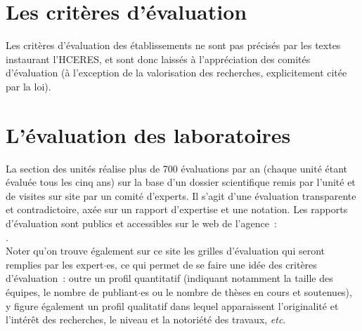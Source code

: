  


%
%
%



\section{Les crit\`eres d'\'evaluation}

Les crit\`eres d'\'evaluation des \'etablissements ne sont pas pr\'ecis\'es par les textes
instaurant l'HCERES, et sont donc laiss\'es \`a l'appr\'eciation des comit\'es d'\'evaluation
 (\`a l'exception de la valorisation des recherches, explicitement cit\'ee par la loi).



\section{L'\'evaluation des laboratoires}

La section des unit\'es r\'ealise plus de 700 \'evaluations par an
(chaque unit\'e \'etant \'evalu\'ee tous les cinq ans) sur la base d'un dossier scientifique
remis par l'unit\'e et de visites sur site par un comit\'e d'experts.
Il s'agit d'une \'evaluation transparente et contradictoire,
ax\'ee sur un rapport d'expertise et une notation.
Les rapports d'\'evaluation sont publics et accessibles sur le
web de l'agence~:\\
 .\\

Noter qu'on
trouve \'egalement sur ce site les grilles d'\'evaluation qui seront
remplies par les expert$\cdot$es, ce qui permet de se faire une id\'ee des
crit\`eres d'\'evaluation~: outre un profil quantitatif (indiquant
notamment la taille des \'equipes, le nombre de publiant$\cdot$es ou le
nombre de th\`eses en cours et soutenues), y figure \'egalement un
profil qualitatif dans lequel apparaissent l'originalit\'e et
l'int\'er\^et des recherches, le niveau et la notori\'et\'e des
travaux, {\em etc}.

